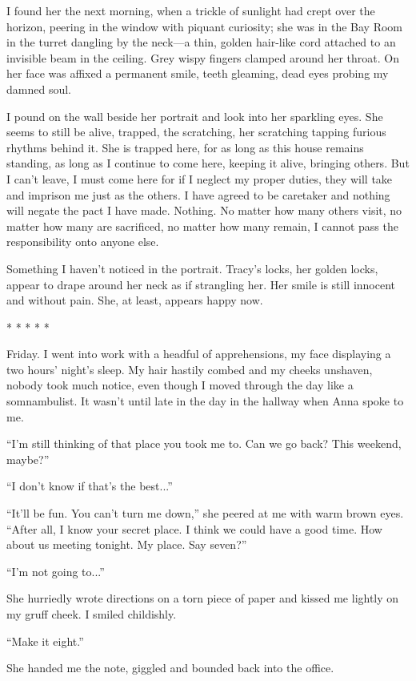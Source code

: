 I found her the next morning, when a trickle of sunlight had crept over
the horizon, peering in the window with piquant curiosity; she was in
the Bay Room in the turret dangling by the neck---a thin, golden
hair-like cord attached to an invisible beam in the ceiling. Grey wispy
fingers clamped around her throat. On her face was affixed a permanent
smile, teeth gleaming, dead eyes probing my damned soul.

I pound on the wall beside her portrait and look into her sparkling
eyes. She seems to still be alive, trapped, the scratching, her
scratching tapping furious rhythms behind it. She is trapped here, for
as long as this house remains standing, as long as I continue to come
here, keeping it alive, bringing others. But I can't leave, I must come
here for if I neglect my proper duties, they will take and imprison me
just as the others. I have agreed to be caretaker and nothing will
negate the pact I have made. Nothing. No matter how many others visit,
no matter how many are sacrificed, no matter how many remain, I cannot
pass the responsibility onto anyone else.

Something I haven't noticed in the portrait. Tracy's locks, her golden
locks, appear to drape around her neck as if strangling her. Her smile
is still innocent and without pain. She, at least, appears happy now.

* * * * *

Friday. I went into work with a headful of apprehensions, my face
displaying a two hours' night's sleep. My hair hastily combed and my
cheeks unshaven, nobody took much notice, even though I moved through
the day like a somnambulist. It wasn't until late in the day in the
hallway when Anna spoke to me.

``I'm still thinking of that place you took me to. Can we go back? This
weekend, maybe?''

``I don't know if that's the best...''

``It'll be fun. You can't turn me down,'' she peered at me with warm
brown eyes. ``After all, I know your secret place. I think we could have
a good time. How about us meeting tonight. My place. Say seven?''

``I'm not going to...''

She hurriedly wrote directions on a torn piece of paper and kissed me
lightly on my gruff cheek. I smiled childishly.

``Make it eight.''

She handed me the note, giggled and bounded back into the office.

